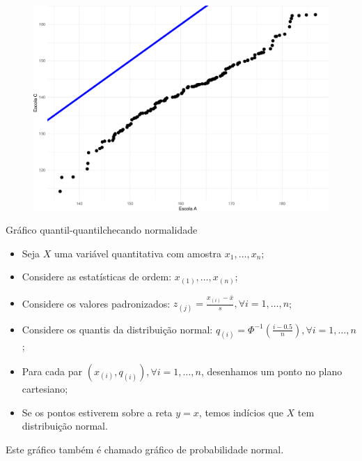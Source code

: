 \documentclass[
  10pt,
  ignorenonframetext,
]{beamer}
\providecommand{\tightlist}{%
  \setlength{\itemsep}{0pt}\setlength{\parskip}{0pt}}\usepackage{longtable,booktabs,array}
\begin{document}
\begin{frame}
\begin{figure}

{\centering \includegraphics[width=1\textwidth,height=\textheight]{exploracao-visualizacao_files/figure-beamer/unnamed-chunk-123-1.pdf}

}

\end{figure}
\end{frame}

\begin{frame}{Gráfico quantil-quantil\newline checando normalidade}
\protect\hypertarget{gruxe1fico-quantil-quantilchecando-normalidade}{}
\begin{itemize}
\tightlist
\item
  Seja \(X\) uma variável quantitativa com amostra \(x_1, \dots, x_n\);
\item
  Considere as estatísticas de ordem: \(x_{(1)}, \dots, x_{(n)}\);
\item
  Considere os valores padronizados:
  \(z_{(j)} = \frac{x_{(i)} - \bar{x}}{s}, \forall i=1, \dots, n\);
\item
  Considere os quantis da distribuição normal:
  \(q_{(i)} = \Phi^{-1} \left( \frac{i-0.5}{n} \right), \forall i=1, \dots, n\);
\item
  Para cada par \((x_{(i)}, q_{(i)}), \forall i=1, \dots,n\), desenhamos
  um ponto no plano cartesiano;
\item
  Se os pontos estiverem sobre a reta \(y=x\), temos indícios que \(X\)
  tem distribuição normal.
\end{itemize}

Este gráfico também é chamado
\textcolor{titulo}{gráfico de probabilidade normal}.
\end{frame}
\end{document}
